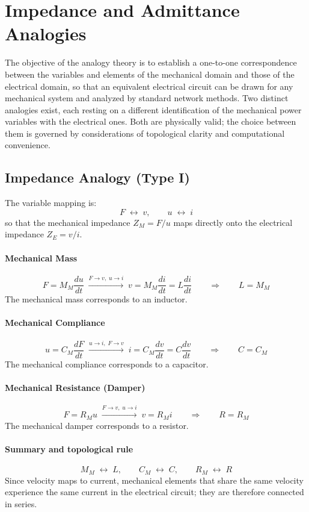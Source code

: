 \section{Impedance and Admittance Analogies}

The objective of the analogy theory is to establish a one-to-one correspondence 
between the variables and elements of the mechanical domain and those of the 
electrical domain, so that an equivalent electrical circuit can be drawn for any 
mechanical system and analyzed by standard network methods. Two distinct analogies 
exist, each resting on a different identification of the mechanical power variables 
with the electrical ones. Both are physically valid; the choice between them is 
governed by considerations of topological clarity and computational convenience.

\subsection{Impedance Analogy (Type I)}

The variable mapping is:
\[
F \;\leftrightarrow\; v, \qquad u \;\leftrightarrow\; i
\]
so that the mechanical impedance \(Z_M = F/u\) maps directly onto the electrical 
impedance \(Z_E = v/i\).

\paragraph{Mechanical Mass}
\[
F = M_M \frac{du}{dt}
\;\xrightarrow{F\to v,\;u\to i}\;
v = M_M \frac{di}{dt} = L \frac{di}{dt}
\qquad\Longrightarrow\qquad
L = M_M
\]
The mechanical mass corresponds to an inductor.

\paragraph{Mechanical Compliance}
\[
u = C_M \frac{dF}{dt}
\;\xrightarrow{u\to i,\;F\to v}\;
i = C_M \frac{dv}{dt} = C \frac{dv}{dt}
\qquad\Longrightarrow\qquad
C = C_M
\]
The mechanical compliance corresponds to a capacitor.

\paragraph{Mechanical Resistance (Damper)}
\[
F = R_M u
\;\xrightarrow{F\to v,\;u\to i}\;
v = R_M i
\qquad\Longrightarrow\qquad
R = R_M
\]
The mechanical damper corresponds to a resistor.

\paragraph{Summary and topological rule}
\[
M_M \;\leftrightarrow\; L, \qquad C_M \;\leftrightarrow\; C, 
\qquad R_M \;\leftrightarrow\; R
\]
Since velocity maps to current, mechanical elements that share the same velocity 
experience the same current in the electrical circuit; they are therefore connected 
in series.

